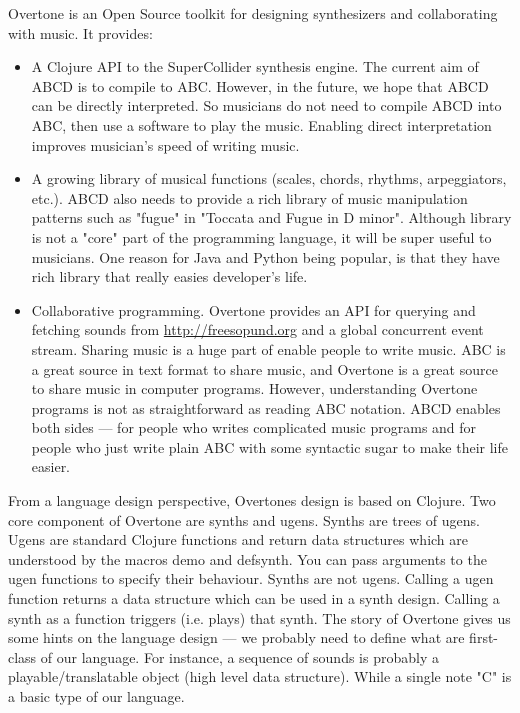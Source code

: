 Overtone is an Open Source toolkit for designing synthesizers and collaborating with music. It provides\cite{Aaron16}:
\begin{itemize}
\item A Clojure API to the SuperCollider synthesis engine. The current aim of ABCD is to compile to ABC. However, in the future, we hope that ABCD can be directly interpreted. So musicians do not need to compile ABCD into ABC, then use a software to play the music. Enabling direct interpretation improves musician's speed of writing music.
\item A growing library of musical functions (scales, chords, rhythms, arpeggiators, etc.). ABCD also needs to provide a rich library of music manipulation patterns such as "fugue" in "Toccata and Fugue in D minor". Although library is not a "core" part of the programming language, it will be super useful to musicians. One reason for Java and Python being popular, is that they have rich library that really easies developer's life.
\item Collaborative programming. Overtone provides an API for querying and fetching sounds from \url{http://freesopund.org} and a global concurrent event stream\cite{Aaron16}. Sharing music is a huge part of enable people to write music. ABC is a great source in text format to share music, and Overtone is a great source to share music in computer programs. However, understanding Overtone programs is not as straightforward as reading ABC notation. ABCD enables both sides --- for people who writes complicated music programs and for people who just write plain ABC with some syntactic sugar to make their life easier.
\end{itemize}

From a language design perspective, Overtones design is based on Clojure. Two core component of Overtone are synths and ugens. Synths are trees of ugens. Ugens are standard Clojure functions and return data structures which are understood by the macros demo and defsynth. You can pass arguments to the ugen functions to specify their behaviour. Synths are not ugens. Calling a ugen function returns a data structure which can be used in a synth design. Calling a synth as a function triggers (i.e. plays) that synth.\cite{Aaron14} The story of Overtone gives us some hints on the language design --- we probably need to define what are first-class of our language. For instance, a sequence of sounds is probably a playable/translatable object (high level data structure). While a single note "C" is a basic type of our language.

